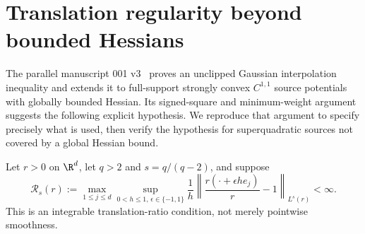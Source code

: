\section{Translation regularity beyond bounded Hessians}\label{sec:translation}
The parallel manuscript 001 v3~\cite{M001v3} proves an unclipped Gaussian interpolation inequality and extends it to full-support strongly convex $C^{1,1}$ source potentials with globally bounded Hessian. Its signed-square and minimum-weight argument suggests the following explicit hypothesis. We reproduce that argument to specify precisely what is used, then verify the hypothesis for superquadratic sources not covered by a global Hessian bound.

Let $r>0$ on $\R^d$, let $q>2$ and $s=q/(q-2)$, and suppose
\begin{equation}\label{eq:translation-assumption}
 \mathcal R_s(r):=\max_{1\le j\le d}\sup_{0<h\le1,\,\epsilon\in\{-1,1\}}
 \frac1h\left\|\frac{r(\cdot+\epsilon he_j)}r-1\right\|_{L^s(r)}<\infty.
\end{equation}
This is an integrable translation-ratio condition, not merely pointwise smoothness.

